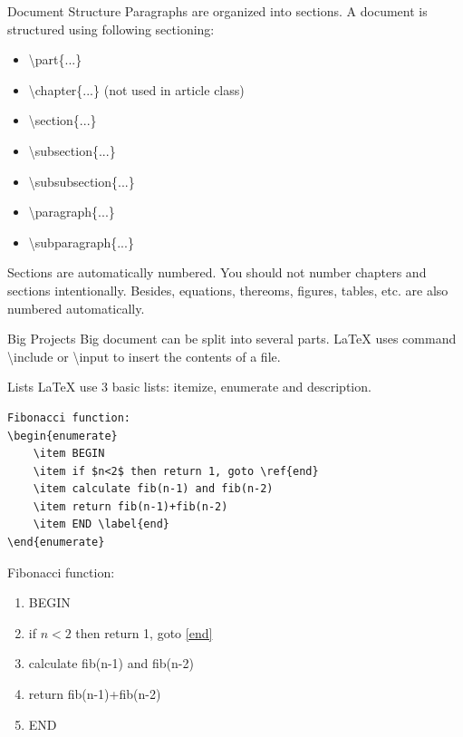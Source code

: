 \documentclass[10pt]{beamer}
\begin{document}
\begin{frame}{Document Structure}
Paragraphs are organized into sections.
A document is structured using following sectioning:
\begin{itemize}
    \item \textbackslash part\{...\}
    \item \textbackslash chapter\{...\} (\alert{not used in article class})
    \item \textbackslash section\{...\}
    \item \textbackslash subsection\{...\}
    \item \textbackslash subsubsection\{...\}
    \item \textbackslash paragraph\{...\}
    \item \textbackslash subparagraph\{...\}
\end{itemize}

Sections are automatically numbered. You should not number chapters
and sections intentionally. Besides, equations, thereoms, figures,
tables, etc. are also numbered automatically.
\end{frame}

\begin{frame}{Big Projects}
    Big document can be split into several parts. \LaTeX{} uses
    command \alert{\textbackslash include} or \alert{\textbackslash input}
    to insert the contents of a file.


\end{frame}

\begin{frame}[fragile]{Lists}
    \LaTeX{} use 3 basic lists: itemize, enumerate and description.

\begin{verbatim}
Fibonacci function:
\begin{enumerate}
    \item BEGIN
    \item if $n<2$ then return 1, goto \ref{end}
    \item calculate fib(n-1) and fib(n-2)
    \item return fib(n-1)+fib(n-2)
    \item END \label{end}
\end{enumerate}
\end{verbatim}

\begin{boxedminipage}{0.8\textwidth}
Fibonacci function:
\begin{enumerate}
    \item BEGIN
    \item if $n<2$ then return 1, goto \ref{end}
    \item calculate fib(n-1) and fib(n-2)
    \item return fib(n-1)+fib(n-2)
    \item END \label{end}
\end{enumerate}
    \end{boxedminipage}
\end{frame}
\end{document}
